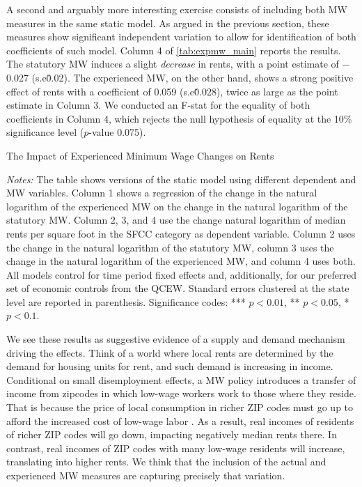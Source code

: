 A second and arguably more interesting exercise consists of including both MW measures in
the same static model. As argued in the previous section, these measures show significant
independent variation to allow for identification of both coefficients of such model. 
Column 4 of \autoref{tab:expmw_main} reports the results. The statutory MW induces
a slight \textit{decrease} in rents, with a point estimate of $-$0.027 (s.e\. 0.02). The 
experienced MW, on the other hand, shows a strong positive effect of rents with a 
coefficient of 0.059 (s.e\. 0.028), twice as large as the point estimate in Column 3. We
conducted an F-stat for the equality of both coefficients in Column 4, which rejects the
null hypothesis of equality at the 10\% significance level ($p$-value 0.075). 

\begin{table}[htb!]\centering
	\caption{The Impact of Experienced Minimum Wage Changes on Rents}
	\label{tab:expmw_main}
	
	\begin{minipage}{0.95\textwidth}\footnotesize
		\vspace{3mm}	
		\textit{Notes:} The table shows versions of the static model using different 
		dependent and MW variables. Column 1 shows a regression of the change in the natural 
		logarithm of the experienced MW on the change in the natural logarithm of the 
		statutory MW. Column 2, 3, and 4 use the change natural logarithm of median rents per 
		square foot in the SFCC category as dependent variable. Column 2 uses the change in 
		the natural logarithm of the statutory MW, column 3 uses the change in the natural 
		logarithm of the experienced MW, and column 4 uses both. All models control for time 
		period fixed effects and, additionally, for our preferred set of economic controls 
		from the QCEW. 
		Standard errors clustered at the state level are reported in parenthesis. Significance 
		codes: *** $p < 0.01$, ** $p < 0.05$, * $p < 0.1$.
	\end{minipage}
\end{table}

We see these results as suggestive evidence of a supply and demand mechanism driving the 
effects. Think of a world where local rents are determined by the demand for housing units for
rent, and such demand is increasing in income. Conditional on small disemployment effects, a MW
policy introduces a transfer of income from zipcodes in which low-wage workers work to those 
where they reside. That is because the price of local consumption in richer ZIP codes must go 
up to afford the increased cost of low-wage labor \parencite[as exemplified by, e.g., ][]
{allegretto2018local}. As a result, real incomes of residents of richer ZIP codes will go down, 
impacting negatively median rents there. In contrast, real incomes of ZIP codes with many 
low-wage residents will increase, translating into higher rents. We think that the inclusion 
of the actual and experienced MW measures are capturing precisely that variation.
